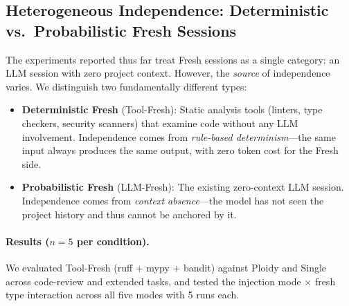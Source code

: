\documentclass[11pt]{article}
\begin{document}
\subsection{Heterogeneous Independence: Deterministic vs.\ Probabilistic Fresh Sessions}
\label{sec:heterogeneous}

The experiments reported thus far treat Fresh sessions as a single category: an LLM session with zero project context. However, the \emph{source} of independence varies. We distinguish two fundamentally different types:

\begin{itemize}[leftmargin=1.5em]
  \item \textbf{Deterministic Fresh} (Tool-Fresh): Static analysis tools (linters, type checkers, security scanners) that examine code without any LLM involvement. Independence comes from \emph{rule-based determinism}---the same input always produces the same output, with zero token cost for the Fresh side.
  \item \textbf{Probabilistic Fresh} (LLM-Fresh): The existing zero-context LLM session. Independence comes from \emph{context absence}---the model has not seen the project history and thus cannot be anchored by it.
\end{itemize}

\paragraph{Results ($n{=}5$ per condition).} We evaluated Tool-Fresh (ruff + mypy + bandit) against Ploidy and Single across code-review and extended tasks, and tested the injection mode $\times$ fresh type interaction across all five modes with 5 runs each.
\end{document}
